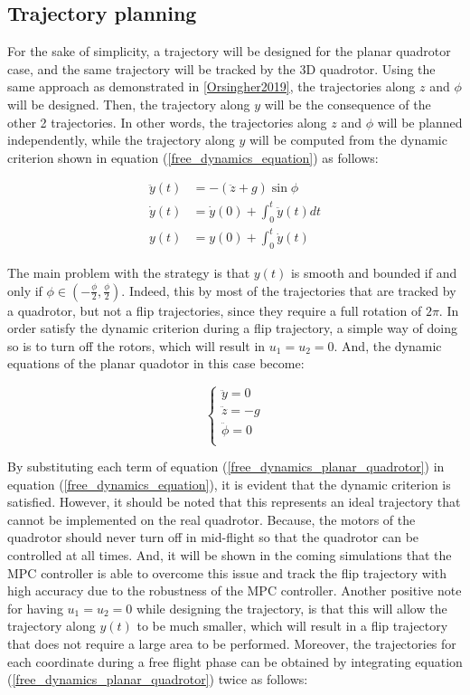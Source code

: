 \documentclass{thesisreport}
\begin{document}
\subsection{Trajectory planning}


For the sake of simplicity, a trajectory will be designed for the planar quadrotor case, and the same trajectory will be tracked by the 3D quadrotor. 
Using the same approach as demonstrated in \ref{Orsingher2019}, the trajectories along $z$ and $\phi$ will be designed. Then, the trajectory along $y$ will be the consequence of the other 2 trajectories. In other words, the trajectories along $z$ and $\phi$ will be planned independently, while the trajectory along $y$ will be computed from the dynamic criterion shown in equation (\ref{free_dynamics_equation}) as follows: 

\begin{align}
	\ddot{y}(t) &= - (\ddot{z} + g) \sin \phi\\
	\dot{y}(t)  &= \dot{y}(0) + \int_0^t \ddot{y}(t) dt \\
	y(t) &= y(0) + \int_0^t \dot{y}(t)
\end{align}

\newpage

The main problem with the strategy is that $y(t)$ is smooth and bounded if and only if $\phi \in (-\frac{\phi}{2}, \frac{\phi}{2})$. Indeed, this by most of the trajectories that are tracked by a quadrotor, but not a flip trajectories, since they require a full rotation of $2 \pi$. In order satisfy the dynamic criterion during a flip trajectory, a simple way of doing so is to turn off the rotors, which will result in $u_1=u_2=0$. And, the dynamic equations of the planar quadotor in this case become:

\begin{equation}\label{free_dynamics_planar_quadrotor}
 \begin{cases} 
       \ddot{y} = 0 \\
       \ddot{z} = - g  \\
       \ddot{\phi} = 0 \\
   \end{cases}
\end{equation}

By substituting each term of equation (\ref{free_dynamics_planar_quadrotor}) in equation (\ref{free_dynamics_equation}), it is evident that the dynamic criterion is satisfied. However, it should be noted that this represents an ideal trajectory that cannot be implemented on the real quadrotor. Because, the motors of the quadrotor should never turn off in mid-flight so that the quadrotor can be controlled at all times. 
And, it will be shown in the coming simulations that the MPC controller is able to overcome this issue and track the flip trajectory with high accuracy due to the robustness of the MPC controller. Another positive note for having $u_1=u_2=0$ while designing the trajectory, is that this will allow the trajectory along $y(t)$ to be much smaller, which will result in a flip trajectory that does not require a large area to be performed.
Moreover, the trajectories for each coordinate during a free flight phase can be obtained by integrating equation (\ref{free_dynamics_planar_quadrotor}) twice as follows:
\end{document}
